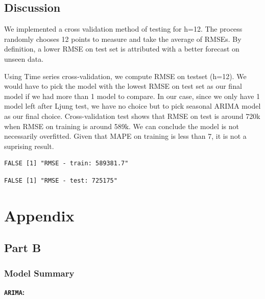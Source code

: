 \documentclass[openany]{book}
\begin{document}
\section*{Discussion}\label{b-discussion}

We implemented a cross validation method of testing for h=12. The
process randomly chooses 12 points to measure and take the average of
RMSEs. By definition, a lower RMSE on test set is attributed with a
better forecast on unseen data.

Using Time series cross-validation, we compute RMSE on testset (h=12).
We would have to pick the model with the lowest RMSE on test set as our
final model if we had more than 1 model to compare. In our case, since
we only have 1 model left after Ljung test, we have no choice but to
pick seasonal ARIMA model as our final choice. Cross-validation test
shows that RMSE on test is around 720k when RMSE on training is around
589k. We can conclude the model is not necessarily overfitted. Given
that MAPE on training is less than 7, it is not a suprising result.

\begin{verbatim}
FALSE [1] "RMSE - train: 589381.7"
\end{verbatim}

\begin{verbatim}
FALSE [1] "RMSE - test: 725175"
\end{verbatim}

\chapter*{Appendix}\label{Appendix}

\section*{Part B}\label{Part-B}

\subsection*{Model Summary}\label{Part-B-summary}

\textbf{\texttt{ARIMA}:}
\end{document}

